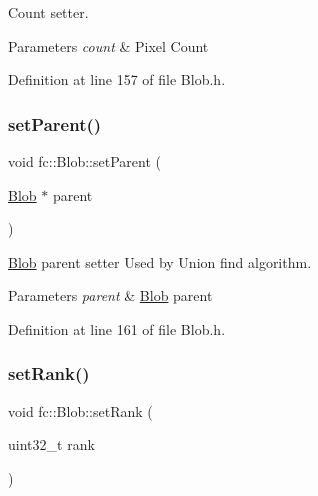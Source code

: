 Count setter. 


\begin{DoxyParams}{Parameters}
{\em count} & Pixel Count \\
\hline
\end{DoxyParams}


Definition at line 157 of file Blob.\+h.

\mbox{\label{classfc_1_1Blob_a88b9a5ef4d1ea26fd9e313b8d033d721}} 
\subsubsection{\texorpdfstring{set\+Parent()}{setParent()}}
{\footnotesize\ttfamily void fc\+::\+Blob\+::set\+Parent (\begin{DoxyParamCaption}\item[{\hyperlink{classfc_1_1Blob}{Blob} $\ast$}]{parent }\end{DoxyParamCaption})\hspace{0.3cm}{\ttfamily [inline]}}



\hyperlink{classfc_1_1Blob}{Blob} parent setter Used by Union find algorithm. 


\begin{DoxyParams}{Parameters}
{\em parent} & \hyperlink{classfc_1_1Blob}{Blob} parent \\
\hline
\end{DoxyParams}


Definition at line 161 of file Blob.\+h.

\mbox{\label{classfc_1_1Blob_a21fdbcaf66775d27bb7680402fe2fd8a}} 
\subsubsection{\texorpdfstring{set\+Rank()}{setRank()}}
{\footnotesize\ttfamily void fc\+::\+Blob\+::set\+Rank (\begin{DoxyParamCaption}\item[{uint32\+\_\+t}]{rank }\end{DoxyParamCaption})\hspace{0.3cm}{\ttfamily [inline]}}



